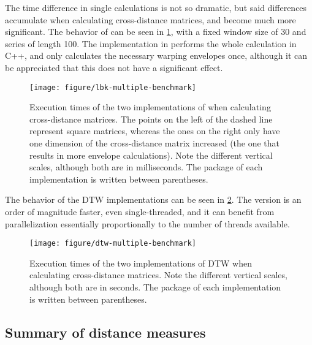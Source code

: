 The time difference in single calculations is not so dramatic,
but said differences accumulate when calculating cross-distance matrices,
and become much more significant.
The behavior of  can be seen in \cref{fig:lbk-multiple-benchmark},
with a fixed window size of 30 and series of length 100.
The implementation in \dtwclust{} performs the whole calculation in C++,
and only calculates the necessary warping envelopes once,
although it can be appreciated that this does not have a significant effect.

\begin{figure}[htbp]

	{\centering \texttt{[image: figure/lbk-multiple-benchmark]}
	}

	\caption{Execution times of the  two implementations of  when calculating cross-distance matrices. The points on the left of the dashed line represent square matrices, whereas the ones on the right only have one dimension of the cross-distance matrix increased (the one that results in more envelope calculations). Note the different vertical scales, although both are in milliseconds. The package of each implementation is written between parentheses.}\label{fig:lbk-multiple-benchmark}
\end{figure}

The behavior of the DTW implementations can be seen in \cref{fig:dtw-multiple-benchmark}.
The \dtwclust{} version is an order of magnitude faster,
even single-threaded,
and it can benefit from parallelization essentially proportionally to the number of threads available.

\begin{figure}[htbp]

	{\centering \texttt{[image: figure/dtw-multiple-benchmark]}

	}

	\caption{Execution times of the  two implementations of DTW when calculating cross-distance matrices. Note the different vertical scales, although both are in seconds. The package of each implementation is written between parentheses.}\label{fig:dtw-multiple-benchmark}
\end{figure}

\subsection{Summary of distance measures}
\label{sec:distances-summary}


